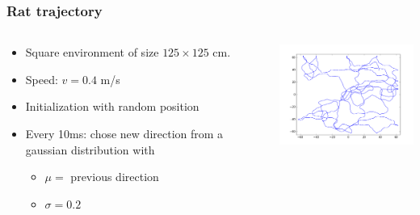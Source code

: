 \documentclass[mathserif]{beamer}
\begin{document}
%
\begin{frame}
\frametitle{Rat trajectory}
  \begin{columns}[T]
    \begin{column}{.5\textwidth}
			\begin{itemize}
		    \item Square environment of size $125 \times 125$ cm.
		    \item Speed: $v=0.4$ m/s
		    \item Initialization with random position
		    \item Every 10ms: chose new direction from a gaussian distribution with 
		    	\begin{itemize}
		    	\item $\mu=$ previous direction
		    	\item $\sigma= 0.2$
		    	\end{itemize}
		    \end{itemize}
    \end{column}
    \begin{column}{.5\textwidth}
    \includegraphics[width=6cm]{running_rat.png}
    \end{column}
  \end{columns}
\end{frame}



\end{document}
